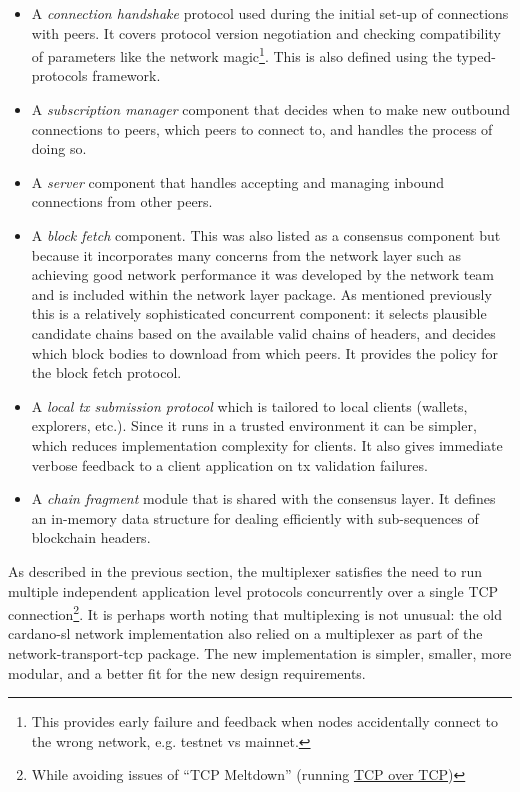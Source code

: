 \documentclass[11pt,a4paper]{article}
\begin{document}
\begin{itemize}
\item
  A \emph{connection handshake} protocol used during the initial set-up
  of connections with peers. It covers protocol version negotiation and
  checking compatibility of parameters like the network magic\footnote{This
    provides early failure and feedback when nodes accidentally connect
    to the wrong network, e.g. testnet vs mainnet.}. This is also
  defined using the typed-protocols framework.
\item
  A \emph{subscription manager} component that decides when to make new
  outbound connections to peers, which peers to connect to, and handles
  the process of doing so.
\item
  A \emph{server} component that handles accepting and managing inbound
  connections from other peers.
\item
  A \emph{block fetch} component. This was also listed as a consensus
  component but because it incorporates many concerns from the network
  layer such as achieving good network performance it was developed by
  the network team and is included within the network layer package. As
  mentioned previously this is a relatively sophisticated concurrent
  component: it selects plausible candidate chains based on the
  available valid chains of headers, and decides which block bodies to
  download from which peers. It provides the policy for the block fetch
  protocol.
\item
  A \emph{local tx submission protocol} which is tailored to local
  clients (wallets, explorers, etc.). Since it runs in a trusted
  environment it can be simpler, which reduces implementation complexity
  for clients. It also gives immediate verbose feedback to a client
  application on tx validation failures.
\item
  A \emph{chain fragment} module that is shared with the consensus
  layer. It defines an in-memory data structure for dealing efficiently
  with sub-sequences of blockchain headers.
\end{itemize}

As described in the previous section, the multiplexer satisfies the need
to run multiple independent application level protocols concurrently
over a single TCP connection\footnote{While avoiding issues of ``TCP
  Meltdown'' (running
  \href{https://en.wikipedia.org/wiki/Tunneling_protocol\#Secure_Shell_tunneling}{{TCP
  over TCP}})}. It is perhaps worth noting that multiplexing is not
unusual: the old cardano-sl network implementation also relied on a
multiplexer as part of the network-transport-tcp package. The new
implementation is simpler, smaller, more modular, and a better fit for
the new design requirements.
\end{document}
